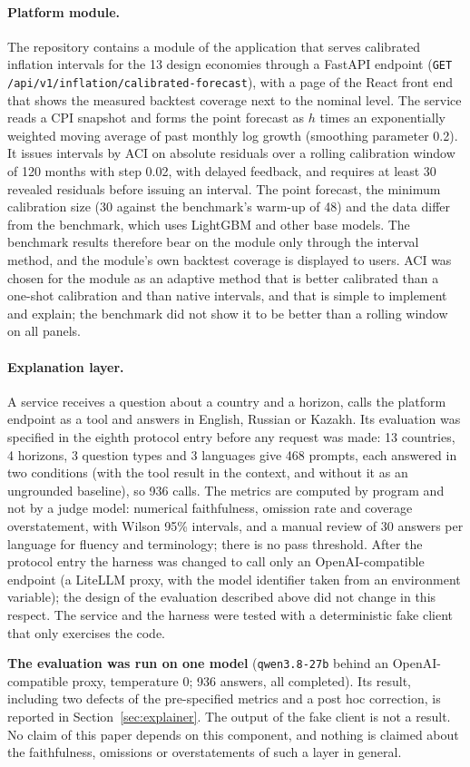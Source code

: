 \paragraph{Platform module.} The repository contains a module of the application that serves calibrated inflation intervals for the 13 design economies through a FastAPI endpoint (\texttt{GET /api/v1/inflation/calibrated-forecast}), with a page of the React front end that shows the measured backtest coverage next to the nominal level. The service reads a CPI snapshot and forms the point forecast as $h$ times an exponentially weighted moving average of past monthly log growth (smoothing parameter 0.2). It issues intervals by ACI on absolute residuals over a rolling calibration window of 120 months with step 0.02, with delayed feedback, and requires at least 30 revealed residuals before issuing an interval. The point forecast, the minimum calibration size (30 against the benchmark's warm-up of 48) and the data differ from the benchmark, which uses LightGBM and other base models. The benchmark results therefore bear on the module only through the interval method, and the module's own backtest coverage is displayed to users. ACI was chosen for the module as an adaptive method that is better calibrated than a one-shot calibration and than native intervals, and that is simple to implement and explain; the benchmark did not show it to be better than a rolling window on all panels.

\paragraph{Explanation layer.} A service receives a question about a country and a horizon, calls the platform endpoint as a tool and answers in English, Russian or Kazakh. Its evaluation was specified in the eighth protocol entry before any request was made: 13 countries, 4 horizons, 3 question types and 3 languages give 468 prompts, each answered in two conditions (with the tool result in the context, and without it as an ungrounded baseline), so 936 calls. The metrics are computed by program and not by a judge model: numerical faithfulness, omission rate and coverage overstatement, with Wilson 95\% intervals, and a manual review of 30 answers per language for fluency and terminology; there is no pass threshold. After the protocol entry the harness was changed to call only an OpenAI-compatible endpoint (a LiteLLM proxy, with the model identifier taken from an environment variable); the design of the evaluation described above did not change in this respect. The service and the harness were tested with a deterministic fake client that only exercises the code.

\textbf{The evaluation was run on one model} (\texttt{qwen3.8-27b} behind an OpenAI-compatible proxy, temperature 0; 936 answers, all completed). Its result, including two defects of the pre-specified metrics and a post hoc correction, is reported in Section~\ref{sec:explainer}. The output of the fake client is not a result. No claim of this paper depends on this component, and nothing is claimed about the faithfulness, omissions or overstatements of such a layer in general.
